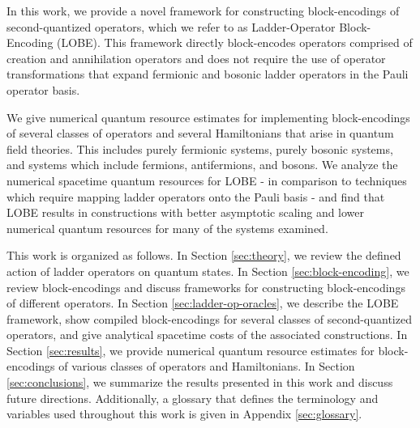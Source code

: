 In this work, we provide a novel framework for constructing block-encodings of second-quantized operators, which we refer to as Ladder-Operator Block-Encoding (LOBE).
This framework directly block-encodes operators comprised of creation and annihilation operators and does not require the use of operator transformations that expand fermionic \cite{jordan1928paulische, bravyi2002fermionic, seeley2012bravyi} and bosonic \cite{somma2005quantum}  ladder operators in the Pauli operator basis.

We give numerical quantum resource estimates for implementing block-encodings of several classes of operators and several Hamiltonians that arise in quantum field theories.
This includes purely fermionic systems, purely bosonic systems, and systems which include fermions, antifermions, and bosons. 
We analyze the numerical spacetime quantum resources for LOBE - in comparison to techniques which require mapping ladder operators onto the Pauli basis - and find that LOBE results in constructions with better asymptotic scaling and lower numerical quantum resources for many of the systems examined.

This work is organized as follows.
In Section \ref{sec:theory}, we review the defined action of ladder operators on quantum states.
In Section \ref{sec:block-encoding}, we review block-encodings and discuss frameworks for constructing block-encodings of different operators.
In Section \ref{sec:ladder-op-oracles}, we describe the LOBE framework, show compiled block-encodings for several classes of second-quantized operators, and give analytical spacetime costs of the associated constructions.
In Section \ref{sec:results}, we provide numerical quantum resource estimates for block-encodings of various classes of operators and Hamiltonians.
In Section \ref{sec:conclusions}, we summarize the results presented in this work and discuss future directions.
Additionally, a glossary that defines the terminology and variables used throughout this work is given in Appendix \ref{sec:glossary}.
